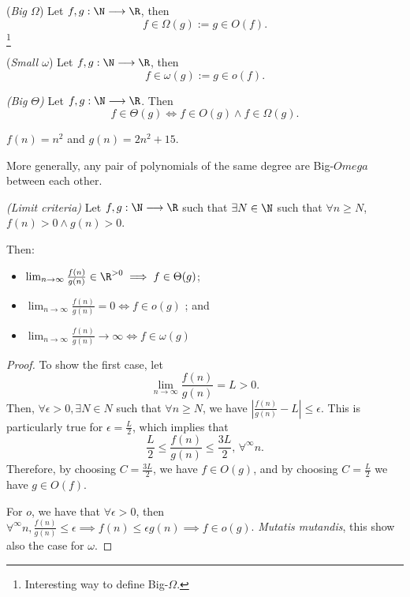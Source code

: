 \begin{definition}
    (\emph{Big $\Omega$}) Let $f,g: \N \longrightarrow \R$, then \[
	f\in \Omega(g) := g\in O(f)
    .\]\footnote{Interesting way to define Big-$\Omega$.}
\end{definition}
\begin{definition}
     (\emph{Small $\omega$})
    Let $f,g: \N \longrightarrow \R$, then \[
	f\in \omega(g) := g\in o(f)
    .\]
\end{definition}

\begin{definition}
    \emph{(Big $\Theta$)} Let $f,g: \N \longrightarrow \R$. Then \[
	f\in \Theta(g) \iff f\in O(g) \land f\in \Omega(g)
    .\] 
\end{definition}

\begin{eg}
    $f(n)=n^2$ and $g(n)=2n^2+15$.
\end{eg}

More generally, any pair of polynomials of the same degree are Big-$Omega$ between each other.

\begin{theorem}
    \emph{(Limit criteria)}
    Let $f,g: \N \longrightarrow \R$ such that $\exists N\in \N$ such that $\forall n\ge N$, $f(n)>0\land g(n)>0$.

    Then:
    \begin{itemize}
        \item $\lim_{n \to \infty} \frac{f(n)}{g(n)}\in \R^{>0} \implies f\in \Theta(g)$; \\
	\item $\lim_{n \to \infty} \frac{f(n)}{g(n)}=0 \iff f\in o(g)$ ; and \\
	\item $\lim_{n \to \infty} \frac{f(n)}{g(n)}\to \infty \iff f\in \omega(g)$
    \end{itemize}
\end{theorem}
\begin{proof}
To show the first case, let \[
    \lim_{n \to \infty} \frac{f(n)}{g(n)} = L > 0
.\] Then, $\forall \epsilon > 0, \exists N\in N$ such that $\forall n \ge N$, we have $\left| \frac{f(n)}{g(n)}-L \right| \le \epsilon$.
This is particularly true for $\epsilon=\frac{L}{2}$, which implies that \[
\frac{L}{2} \le \frac{f(n)}{g(n)} \le \frac{3L}{2},\,\forall^{\infty}n
.\]
Therefore, by choosing $C=\frac{3L}{2}$, we have $f\in O(g)$, and by choosing $C=\frac{L}{2}$ we have $g\in O(f)$.

For $o$, we have that $\forall \epsilon>0$, then $\forall^{\infty}n, \frac{f(n)}{g(n)}\le \epsilon\implies f(n) \le \epsilon g(n)\implies f\in o(g)$.
\emph{Mutatis mutandis}, this show also the case for $\omega$.

\end{proof}

